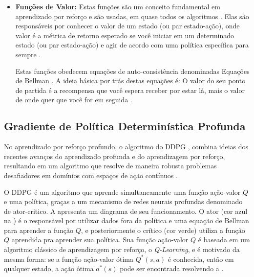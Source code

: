 \begin{itemize}
    \item \textbf{Funções de Valor:} Estas funções são um conceito fundamental em aprendizado por reforço e são usadas, em quase todos os algoritmos \cite{deeprl}. Elas são responsáveis por conhecer o valor de um estado (ou par estado-ação), onde valor é a métrica de retorno esperado se você iniciar em um determinado estado (ou par estado-ação) e agir de acordo com uma política específica para sempre \cite{rl_intro}.

    Estas funções obedecem equações de auto-consistência denominadas Equações de Bellman \cite{bellman, rl_intro}. A ideia básica por trás destas equações é: O valor do seu ponto de partida é a recompensa que você espera receber por estar lá, mais o valor de onde quer que você for em seguida \cite{bellman}.
    
\end{itemize}


\subsection{Gradiente de Política Determinística Profunda}


No aprendizado por reforço profundo, o algoritmo do \acrfull{DDPG} \cite{silver2014deterministic, ddpg}, combina ideias dos recentes avanços do aprendizado profunda e do aprendizagem por reforço, resultando em um algoritmo que resolve de maneira robusta problemas desafiadores em domínios com espaços de ação contínuos \cite{ddpg}. 


O \acrshort{DDPG} é um algoritmo que aprende simultaneamente uma função ação-valor $Q$ e uma política, graças a um mecanismo de redes neurais profundas denominado de ator-critico. A  apresenta um diagrama de seu funcionamento. O ator (cor azul na ) é o responsável por utilizar dados fora da política e uma equação de Bellman para aprender a função $Q$, e posteriormente o crítico (cor verde) utiliza a função $Q$ aprendida pra aprender sua política. Sua função ação-valor $Q$ é baseada em um algoritmo clássico de aprendizagem por reforço, o \emph{Q-Learning}, e é motivado da mesma forma: se a função ação-valor ótima $Q^*(s,a)$ é conhecida, então em qualquer estado, a ação ótima $a^*(s)$ pode ser encontrada resolvendo a .

